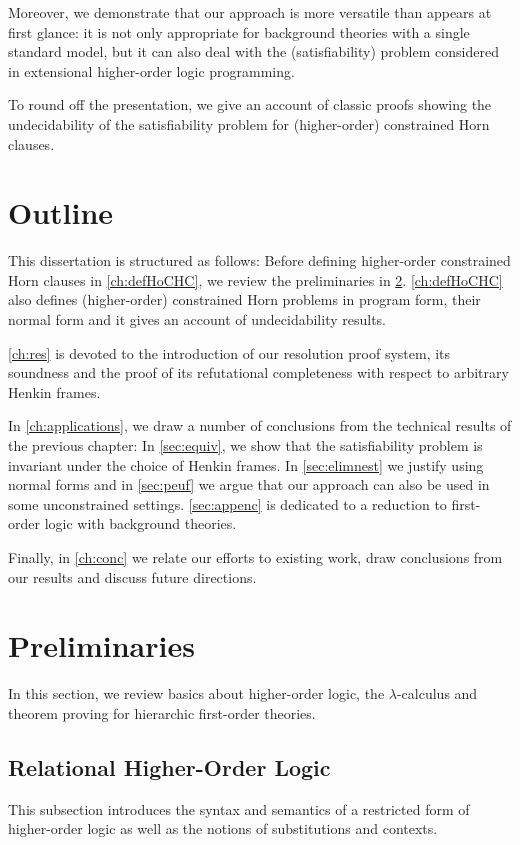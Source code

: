\documentclass[a4paper,twoside,notitlepage,openright,11pt]{report}
\begin{document}
Moreover, we demonstrate that our approach is more versatile than appears at first glance: it is not only appropriate for background theories with a single standard model, but it can also deal with the (satisfiability) problem considered in extensional higher-order logic programming.

To round off the presentation, we give an account of classic proofs showing the undecidability of the satisfiability problem for (higher-order) constrained Horn clauses.

\section{Outline}
This dissertation is structured as follows: Before defining higher-order constrained Horn clauses in \cref{ch:defHoCHC}, we review the preliminaries in \cref{sec:prelims}. \cref{ch:defHoCHC} also defines (higher-order) constrained Horn problems in program form, their normal form and it gives an account of undecidability results.

\cref{ch:res} is devoted to the introduction of our resolution proof system, its soundness and the proof of its refutational completeness with respect to arbitrary Henkin frames.

In \cref{ch:applications}, we draw a number of conclusions from the technical results of the previous chapter: In \cref{sec:equiv}, we show that the satisfiability problem is invariant under the choice of Henkin frames. In \cref{sec:elimnest} we justify using normal forms and in \cref{sec:peuf} we argue that our approach can also be used in some unconstrained settings.
\cref{sec:appenc} is dedicated to  a reduction to first-order logic with background theories.

Finally, in \cref{ch:conc} we relate our efforts to existing work, draw conclusions from our results and discuss future directions.

\section{Preliminaries}
\label{sec:prelims}
In this section, we review basics about higher-order logic, the $\lambda$-calculus and theorem proving for hierarchic first-order theories.

\subsection{Relational Higher-Order Logic}
This subsection introduces the syntax and semantics of a restricted form of higher-order logic as well as the notions of substitutions and contexts. 
\end{document}
